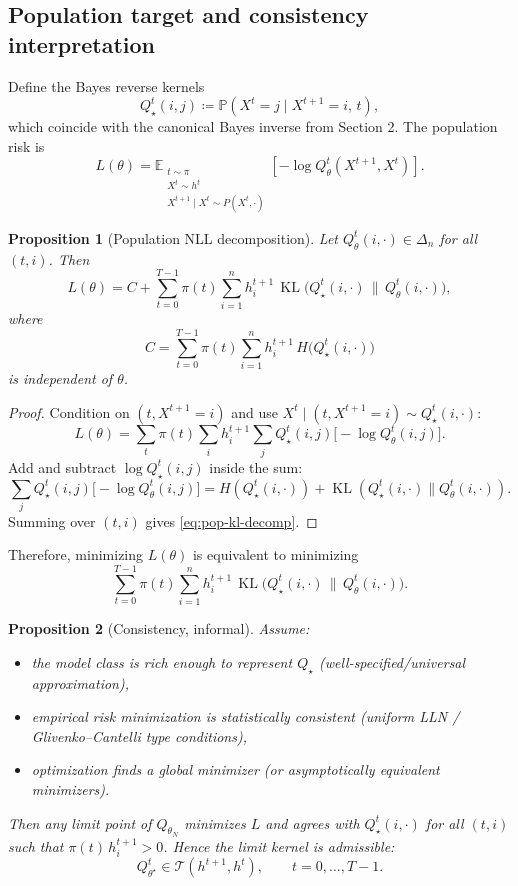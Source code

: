 \documentclass[11pt]{article}
\newcommand{\KL}{\operatorname{KL}}
\newcommand{\Tset}{\mathcal{T}}
\newtheorem{proposition}{Proposition}
\begin{document}
\subsection{Population target and consistency interpretation}
Define the Bayes reverse kernels
\[
Q_\star^t(i,j)\coloneqq \mathbb P(X^t=j\mid X^{t+1}=i,\,t),
\]
which coincide with the canonical Bayes inverse from Section 2.
The population risk is
\[
L(\theta)=\mathbb E_{\substack{t\sim\pi\\X^t\sim h^t\\X^{t+1}\mid X^t\sim P(X^t,\cdot)}}\!\left[-\log Q_\theta^{t}(X^{t+1},X^t)\right].
\]

\begin{proposition}[Population NLL decomposition]
Let $Q_\theta^t(i,\cdot)\in\Delta_n$ for all $(t,i)$. Then
\begin{equation}
\label{eq:pop-kl-decomp}
L(\theta)=C+\sum_{t=0}^{T-1}\pi(t)\sum_{i=1}^n h_i^{t+1}\,
\KL\!\big(Q_\star^t(i,\cdot)\,\|\,Q_\theta^t(i,\cdot)\big),
\end{equation}
where
\[
C=\sum_{t=0}^{T-1}\pi(t)\sum_{i=1}^n h_i^{t+1}\,H\!\big(Q_\star^t(i,\cdot)\big)
\]
is independent of $\theta$.
\end{proposition}
\begin{proof}
Condition on $(t,X^{t+1}=i)$ and use $X^t\mid (t,X^{t+1}=i)\sim Q_\star^t(i,\cdot)$:
\[
L(\theta)=\sum_t \pi(t)\sum_i h_i^{t+1}\sum_j
Q_\star^t(i,j)\big[-\log Q_\theta^t(i,j)\big].
\]
Add and subtract $\log Q_\star^t(i,j)$ inside the sum:
\[
\sum_j Q_\star^t(i,j)\big[-\log Q_\theta^t(i,j)\big]
=H(Q_\star^t(i,\cdot))
+\KL(Q_\star^t(i,\cdot)\|Q_\theta^t(i,\cdot)).
\]
Summing over $(t,i)$ gives \eqref{eq:pop-kl-decomp}.
\end{proof}

Therefore, minimizing $L(\theta)$ is equivalent to minimizing
\[
\sum_{t=0}^{T-1}\pi(t)\sum_{i=1}^n h_i^{t+1}\,
\KL\!\big(Q_\star^t(i,\cdot)\,\|\,Q_\theta^t(i,\cdot)\big).
\]

\begin{proposition}[Consistency, informal]
Assume:
\begin{itemize}
\item the model class is rich enough to represent $Q_\star$ (well-specified/universal approximation),
\item empirical risk minimization is statistically consistent (uniform LLN / Glivenko--Cantelli type conditions),
\item optimization finds a global minimizer (or asymptotically equivalent minimizers).
\end{itemize}
Then any limit point of $Q_{\theta_N}$ minimizes $L$ and agrees with $Q_\star^t(i,\cdot)$ for all $(t,i)$ such that $\pi(t)\,h_i^{t+1}>0$.
Hence the limit kernel is admissible:
\[
Q_{\theta^\star}^t\in\Tset(h^{t+1},h^t),\qquad t=0,\dots,T-1.
\]
\end{proposition}
\end{document}
